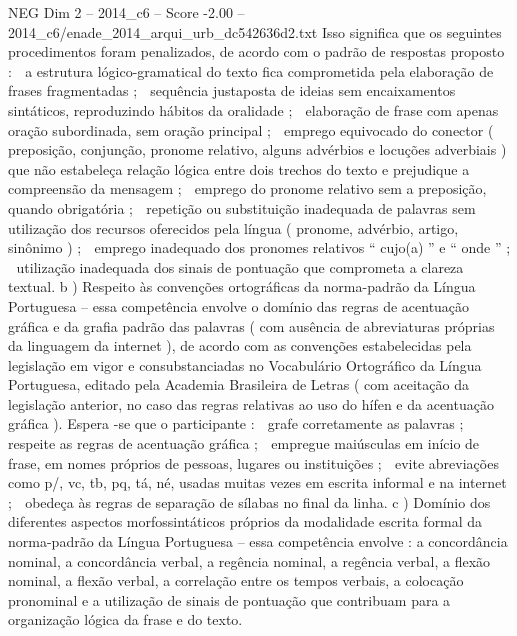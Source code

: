 \begin{textsample}{NEG Dim 2 – 2014\_c6 – Score -2.00 – 2014\_c6/enade\_2014\_arqui\_urb\_dc542636d2.txt}
Isso significa que os seguintes procedimentos foram penalizados, de acordo com o padrão de respostas proposto :  a estrutura lógico-gramatical do texto fica comprometida pela elaboração de frases fragmentadas ;  sequência justaposta de ideias sem encaixamentos sintáticos, reproduzindo hábitos da oralidade ;  elaboração de frase com apenas oração subordinada, sem oração principal ;  emprego equivocado do conector ( preposição, conjunção, pronome relativo, alguns advérbios e locuções adverbiais ) que não estabeleça relação lógica entre dois trechos do texto e prejudique a compreensão da mensagem ;  emprego do pronome relativo sem a preposição, quando obrigatória ;  repetição ou substituição inadequada de palavras sem utilização dos recursos oferecidos pela língua ( pronome, advérbio, artigo, sinônimo ) ;  emprego inadequado dos pronomes relativos “ cujo(a) ” e “ onde ” ;  utilização inadequada dos sinais de pontuação que comprometa a clareza textual. b ) Respeito às convenções ortográficas da norma-padrão da Língua Portuguesa – essa competência envolve o domínio das regras de acentuação gráfica e da grafia padrão das palavras ( com ausência de abreviaturas próprias da linguagem da internet ), de acordo com as convenções estabelecidas pela legislação em vigor e consubstanciadas no Vocabulário Ortográfico da Língua Portuguesa, editado pela Academia Brasileira de Letras ( com aceitação da legislação anterior, no caso das regras relativas ao uso do hífen e da acentuação gráfica ).
Espera -se que o participante :  grafe corretamente as palavras ;  respeite as regras de acentuação gráfica ;  empregue maiúsculas em início de frase, em nomes próprios de pessoas, lugares ou instituições ;  evite abreviações como p/, vc, tb, pq, tá, né, usadas muitas vezes em escrita informal e na internet ;  obedeça às regras de separação de sílabas no final da linha. c ) Domínio dos diferentes aspectos morfossintáticos próprios da modalidade escrita formal da norma-padrão da Língua Portuguesa – essa competência envolve : a concordância nominal, a concordância verbal, a regência nominal, a regência verbal, a flexão nominal, a flexão verbal, a correlação entre os tempos verbais, a colocação pronominal e a utilização de sinais de pontuação que contribuam para a organização lógica da frase e do texto.

\end{textsample}
